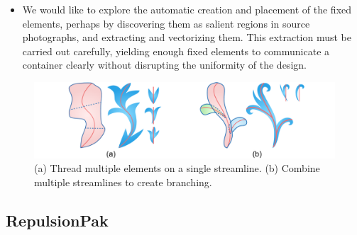 \begin{itemize}
\item {}
We would like to explore the automatic creation and placement of 
the fixed elements, perhaps by discovering them as salient regions 
in source photographs, and extracting and vectorizing them.  This 
extraction must be carried out carefully, yielding enough fixed elements
to communicate a container clearly without disrupting the uniformity of
the design.

\end{itemize}

\begin{figure}
\centering
\includegraphics[width=1.0\textwidth]{figures/conclusions/thread_branch.pdf}
\caption[Element threading and branching]
{ \label{thread_branch} 
\newtext
{
(a) Thread multiple elements on a single streamline.
(b) Combine multiple streamlines to create branching.
}
}
\end{figure}

\subsection{RepulsionPak}


